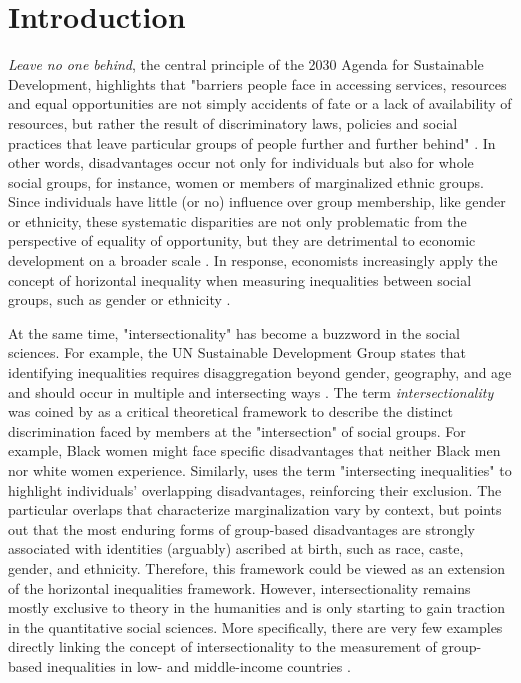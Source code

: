 \onehalfspacing
\hypertarget{introduction}{%
\section{Introduction}\label{introduction}}

\textit{Leave no one behind}, the central principle of the 2030 Agenda for Sustainable Development, highlights that "barriers people face in accessing services, resources and equal opportunities are not simply accidents of fate or a lack of availability of resources, but rather the result of discriminatory laws, policies and social practices that leave particular groups of people further and further behind" \citep{UNSDG2022}. In other words, disadvantages occur not only for individuals but also for whole social groups, for instance, women or members of marginalized ethnic groups. Since individuals have little (or no) influence over group membership, like gender or ethnicity, these systematic disparities are not only problematic from the perspective of equality of opportunity, but they are detrimental to economic development on a broader scale \citep{Ferreira2018, Marrero2013}. In response, economists increasingly apply the concept of horizontal inequality when measuring inequalities between social groups, such as gender or ethnicity \citep{Mancini2008}. 

At the same time, "intersectionality" has become a buzzword in the social sciences. For example, the UN Sustainable Development Group states that identifying inequalities requires disaggregation beyond gender, geography, and age and should occur in multiple and intersecting ways \citep{UNSDG2022}. The term \textit{intersectionality} was coined by \cite{crenshaw1989, Crenshaw1991} as a critical theoretical framework to describe the distinct discrimination faced by members at the "intersection" of social groups. For example, Black women might face specific disadvantages that neither Black men nor white women experience. Similarly, \cite{kabeer2016} uses the term "intersecting inequalities" to highlight individuals' overlapping disadvantages, reinforcing their exclusion. The particular overlaps that characterize marginalization vary by context, but \cite{kabeer2016} points out that the most enduring forms of group-based disadvantages are strongly associated with identities (arguably) ascribed at birth, such as race, caste, gender, and ethnicity. Therefore, this framework could be viewed as an extension of the horizontal inequalities framework. However, intersectionality remains mostly exclusive to theory in the humanities and is only starting to gain traction in the quantitative social sciences. More specifically, there are very few examples directly linking the concept of intersectionality to the measurement of group-based inequalities in low- and middle-income countries \citep[see e.g.,][]{Kabeer2017, Lenhardt2015}.

